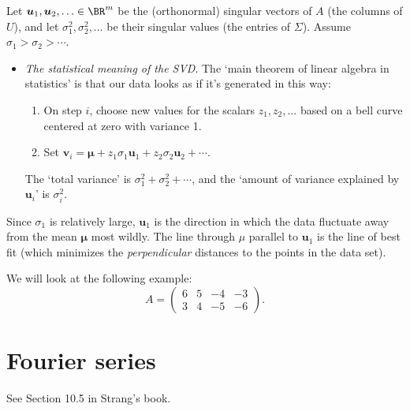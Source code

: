 \documentclass[10pt]{amsart}
\theoremstyle{mythm}
\theoremstyle{definition}
\theoremstyle{myrmk}
\begin{document}
	Let $\bm{u}_1, \bm{u}_2, \ldots \in \BR^m$ be the (orthonormal) singular vectors of $A$ (the columns of $U$), and let $\sigma_1^2, \sigma_2^2, \ldots$ be their singular values (the entries of $\Sigma$). Assume $\sigma_1 > \sigma_2 > \cdots$. 
	\begin{itemize}
		\item \emph{The statistical meaning of the SVD}. The `main theorem of linear algebra in statistics' is that our data looks as if it's generated in this way: 
		\begin{enumerate}
			\item On step $i$, choose new values for the scalars $z_1, z_2, \ldots$ based on a bell curve centered at zero with variance 1. 
			\item Set $\bm{v}_i = \bm{\mu} + z_1 \sigma_1 \bm{u}_1 + z_2 \sigma_2 \bm{u}_2 + \cdots$. 
		\end{enumerate}
		The `total variance' is $\sigma_1^2 + \sigma_2^2 + \cdots$, and the `amount of variance explained by $\bm{u}_i$' is $\sigma_i^2$. 
	\end{itemize}
	Since $\sigma_1$ is relatively large, $\bm{u}_1$ is the direction in which the data fluctuate away from the mean $\bm{\mu}$ most wildly. The line through $\mu$ parallel to $\bm{u}_1$ is the line of best fit (which minimizes the \emph{perpendicular} distances to the points in the data set). 
	
	We will look at the following example: 
	\[
		A = \begin{pmatrix}
		6 & 5 & -4 & -3 \\
		3 & 4 & -5 & -6
		\end{pmatrix}. 
	\]
	
	\newpage 
	
	\section{Fourier series} 
	
	See Section 10.5 in Strang's book. 
	
\end{document}
